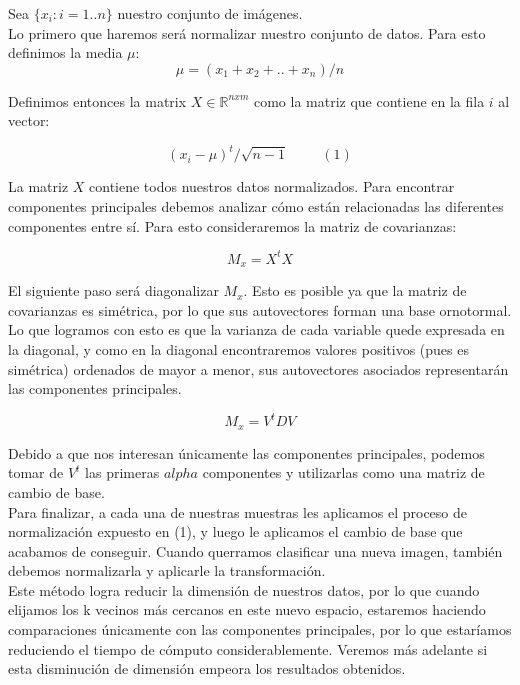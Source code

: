 Sea $\{ x_i : i = 1 .. n\}$ nuestro conjunto de imágenes.  \\

Lo primero que haremos será normalizar nuestro conjunto de datos. Para esto definimos la media $\mu$:
$$ \mu = (x_1 + x_2 + .. + x_n) / n $$

Definimos entonces la matrix $X \in \mathbb{R}^{n x m}$ como la matriz que contiene en la fila $i$ al vector:

$$ (x_i - \mu)^{t} / \sqrt{n-1} \hspace{1cm}(1) $$

La matriz $X$ contiene todos nuestros datos normalizados. Para encontrar componentes principales debemos analizar cómo están relacionadas las diferentes componentes entre sí. Para esto consideraremos la matriz de covarianzas:

$$M_x = X^t X$$

El siguiente paso será diagonalizar $M_x$. Esto es posible ya que la matriz de covarianzas es simétrica, por lo que sus autovectores forman una base ornotormal. Lo que logramos con esto es que la varianza de cada variable quede expresada en la diagonal, y como en la diagonal encontraremos valores positivos (pues es simétrica) ordenados de mayor a menor, sus autovectores asociados representarán las componentes principales.

$$ M_x = V^t D V$$

Debido a que nos interesan únicamente las componentes principales, podemos tomar de $V^t$ las primeras $alpha$ componentes y utilizarlas como una matriz de cambio de base. \\

Para finalizar, a cada una de nuestras muestras les aplicamos el proceso de normalización expuesto en (1), y luego le aplicamos el cambio de base que acabamos de conseguir. Cuando querramos clasificar una nueva imagen, también debemos normalizarla y aplicarle la transformación. \\

Este método logra reducir la dimensión de nuestros datos, por lo que cuando elijamos los k vecinos más cercanos en este nuevo espacio, estaremos haciendo comparaciones únicamente con las componentes principales, por lo que estaríamos reduciendo el tiempo de cómputo considerablemente. Veremos más adelante si esta disminución de dimensión empeora los resultados obtenidos. \\



